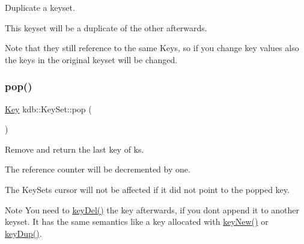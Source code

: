 Duplicate a keyset. 

This keyset will be a duplicate of the other afterwards.

\begin{DoxyNote}{Note}
that they still reference to the same Keys, so if you change key values also the keys in the original keyset will be changed. 
\end{DoxyNote}
\mbox{\label{classkdb_1_1KeySet_a7f207457a1c12633a1a5301a3a1bbaed}} 
\subsubsection{\texorpdfstring{pop()}{pop()}}
{\footnotesize\ttfamily \hyperlink{classkdb_1_1Key}{Key} kdb\+::\+Key\+Set\+::pop (\begin{DoxyParamCaption}{ }\end{DoxyParamCaption})\hspace{0.3cm}{\ttfamily [inline]}}



Remove and return the last key of {\ttfamily ks}. 

The reference counter will be decremented by one.

The Key\+Sets cursor will not be affected if it did not point to the popped key.

\begin{DoxyNote}{Note}
You need to \hyperlink{group__key_ga3df95bbc2494e3e6703ece5639be5bb1}{key\+Del()} the key afterwards, if you don\textquotesingle{}t append it to another keyset. It has the same semantics like a key allocated with \hyperlink{group__key_gad23c65b44bf48d773759e1f9a4d43b89}{key\+New()} or \hyperlink{group__key_gae6ec6a60cc4b8c1463fa08623d056ce3}{key\+Dup()}.
\end{DoxyNote}


